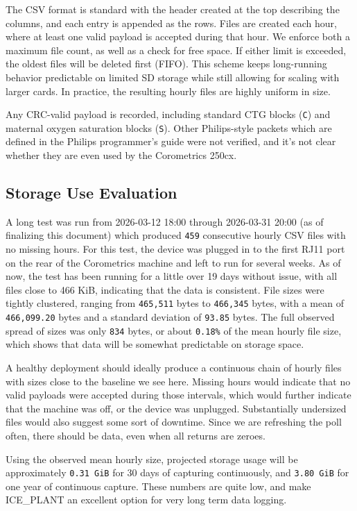 \documentclass[11pt]{article}
\begin{document}
The CSV format is standard with the header created at the top describing the columns, and each entry is appended as the rows. Files are created each hour, where at least one valid payload is accepted during that hour. We enforce both a maximum file count, as well as a check for free space. If either limit is exceeded, the oldest files will be deleted first (FIFO). This scheme keeps long-running behavior predictable on limited SD storage while still allowing for scaling with larger cards. In practice, the resulting hourly files are highly uniform in size.

Any CRC-valid payload is recorded, including standard CTG blocks (\texttt{C}) and maternal oxygen saturation blocks (\texttt{S}). Other Philips-style packets which are defined in the Philips programmer's guide were not verified, and it's not clear whether they are even used by the Corometrics 250cx.

\subsection*{Storage Use Evaluation}
A long test was run from 2026-03-12 18:00 through 2026-03-31 20:00 (as of finalizing this document) which produced \texttt{459} consecutive hourly CSV files with no missing hours. For this test, the device was plugged in to the first RJ11 port on the rear of the Corometrics machine and left to run for several weeks. As of now, the test has been running for a little over 19 days without issue, with all files close to 466 KiB, indicating that the data is consistent. File sizes were tightly clustered, ranging from \texttt{465,511} bytes to \texttt{466,345} bytes, with a mean of \texttt{466,099.20} bytes and a standard deviation of \texttt{93.85} bytes. The full observed spread of sizes was only \texttt{834} bytes, or about \texttt{0.18\%} of the mean hourly file size, which shows that data will be somewhat predictable on storage space. 

A healthy deployment should ideally produce a continuous chain of hourly files with sizes close to the baseline we see here. Missing hours would indicate that no valid payloads were accepted during those intervals, which would further indicate that the machine was off, or the device was unplugged. Substantially undersized files would also suggest some sort of downtime. Since we are refreshing the poll often, there should be data, even when all returns are zeroes. 

Using the observed mean hourly size, projected storage usage will be approximately \texttt{0.31 GiB} for 30 days of capturing continuously, and \texttt{3.80 GiB} for one year of continuous capture. These numbers are quite low, and make ICE\_PLANT an excellent option for very long term data logging.
\end{document}
